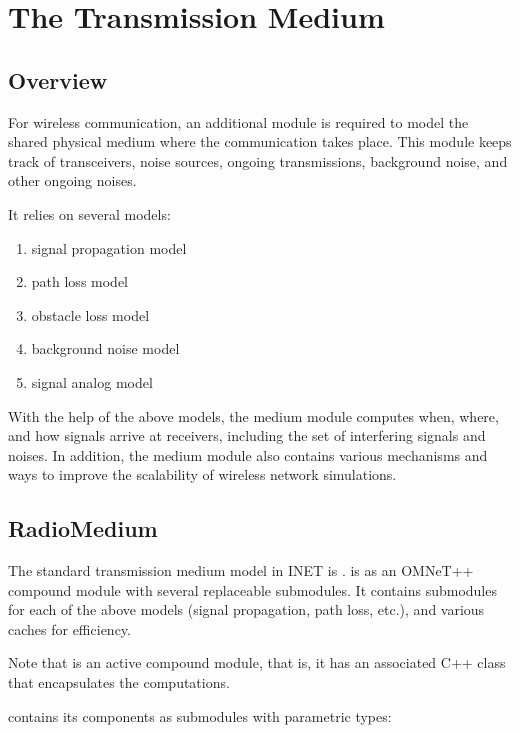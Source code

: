\chapter{The Transmission Medium}
\label{cha:transmission-medium}

\section{Overview}
\label{sec:medium:overview}

For wireless communication, an additional module is required to model the
shared physical medium where the communication takes place. This module
keeps track of transceivers, noise sources, ongoing transmissions,
background noise, and other ongoing noises.

It relies on several models:

\begin{enumerate}
  \item signal propagation model
  \item path loss model
  \item obstacle loss model
  \item background noise model
  \item signal analog model
\end{enumerate}

With the help of the above models, the medium module computes
when, where, and how signals arrive at receivers, including
the set of interfering signals and noises. In addition,
the medium module also contains various mechanisms and ways
to improve the scalability of wireless network simulations.

\section{RadioMedium}
\label{sec:medium:radiomedium}

The standard transmission medium model in INET is .
 is as an OMNeT++ compound module with
several replaceable submodules. It contains submodules for
each of the above models (signal propagation, path loss, etc.),
and various caches for efficiency.

Note that  is an active compound module, that is,
it has an associated C++ class that encapsulates the computations.

 contains its components as submodules
with parametric types:

